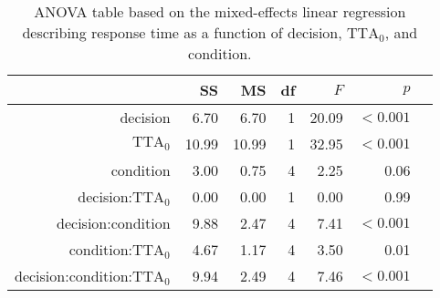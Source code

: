 \begin{table}[h]
\centering
\caption{ANOVA table based on the mixed-effects linear regression describing response time as a function of decision, $\textrm{TTA}_0$, and condition.}
\label{tab:RT}
\begin{tabular}{rrrrrrr}
\toprule
 & SS & MS & df & $F$ & $p$ \\
\midrule
decision & 6.70 & 6.70 & 1 & 20.09 & $<0.001$ \\
$\textrm{TTA}_0$ & 10.99 & 10.99 & 1 & 32.95 & $<0.001$ \\
condition & 3.00 & 0.75 & 4 & 2.25 & 0.06 \\
decision:$\textrm{TTA}_0$ & 0.00 & 0.00 & 1 & 0.00 & 0.99 \\
decision:condition & 9.88 & 2.47 & 4 & 7.41 & $<0.001$ \\
condition:$\textrm{TTA}_0$ & 4.67 & 1.17 & 4 & 3.50 & 0.01 \\
decision:condition:$\textrm{TTA}_0$ & 9.94 & 2.49 & 4 & 7.46 & $<0.001$ \\
\bottomrule
\end{tabular}
\end{table}
